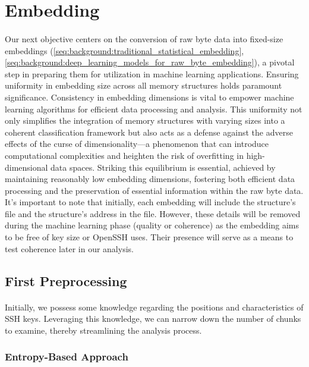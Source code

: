 \section{Embedding}\label{chap:embedding}
        
    \paragraph{}Our next objective centers on the conversion of raw byte data into fixed-size embeddings (\ref{seq:background:traditional_statistical_embedding}, \ref{seq:background:deep_learning_models_for_raw_byte_embedding}), a pivotal step in preparing them for utilization in machine learning applications. Ensuring uniformity in embedding size across all memory structures holds paramount significance. Consistency in embedding dimensions is vital to empower machine learning algorithms for efficient data processing and analysis. This uniformity not only simplifies the integration of memory structures with varying sizes into a coherent classification framework but also acts as a defense against the adverse effects of the curse of dimensionality—a phenomenon that can introduce computational complexities and heighten the risk of overfitting in high-dimensional data spaces. Striking this equilibrium is essential, achieved by maintaining reasonably low embedding dimensions, fostering both efficient data processing and the preservation of essential information within the raw byte data. It's important to note that initially, each embedding will include the structure's file and the structure's address in the file. However, these details will be removed during the machine learning phase (quality or coherence) as the embedding aims to be free of key size or OpenSSH uses. Their presence will serve as a means to test coherence later in our analysis.

\subsection{First Preprocessing}
    \paragraph{}Initially, we possess some knowledge regarding the positions and characteristics of SSH keys. Leveraging this knowledge, we can narrow down the number of chunks to examine, thereby streamlining the analysis process.
    
    \subsubsection{Entropy-Based Approach}
